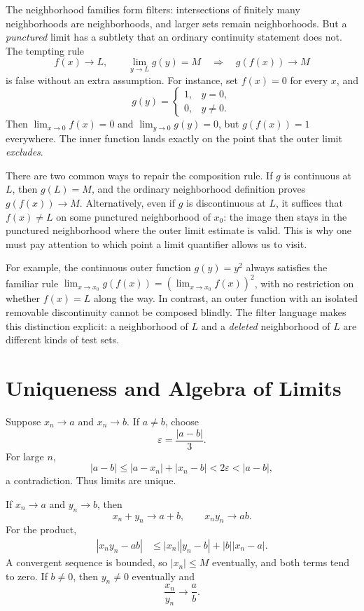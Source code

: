 The neighborhood families form filters: intersections of finitely many neighborhoods are neighborhoods, and larger sets remain neighborhoods. But a \emph{punctured} limit has a subtlety that an ordinary continuity statement does not. The tempting rule
\[
 f(x)\longrightarrow L,\qquad
 \lim_{y\to L}g(y)=M
 \quad\Longrightarrow\quad
 g(f(x))\longrightarrow M
\]
is false without an extra assumption. For instance, set \(f(x)=0\) for every \(x\), and
\[
 g(y)=
 \begin{cases}1,&y=0,\\0,&y\ne0.\end{cases}
\]
Then \(\lim_{x\to0}f(x)=0\) and \(\lim_{y\to0}g(y)=0\), but
\(g(f(x))=1\) everywhere. The inner function lands exactly on the point that the outer limit \emph{excludes}.

There are two common ways to repair the composition rule. If \(g\) is continuous at \(L\), then \(g(L)=M\), and the ordinary neighborhood definition proves \(g(f(x))\to M\). Alternatively, even if \(g\) is discontinuous at \(L\), it suffices that \(f(x)\ne L\) on some punctured neighborhood of \(x_0\): the image then stays in the punctured neighborhood where the outer limit estimate is valid. This is why one must pay attention to which point a limit quantifier allows us to visit.

For example, the continuous outer function \(g(y)=y^2\) always satisfies the familiar rule
\(\lim_{x\to x_0}g(f(x))=(\lim_{x\to x_0}f(x))^2\), with no restriction on whether \(f(x)=L\) along the way. In contrast, an outer function with an isolated removable discontinuity cannot be composed blindly. The filter language makes this distinction explicit: a neighborhood of \(L\) and a \emph{deleted} neighborhood of \(L\) are different kinds of test sets.

\section{Uniqueness and Algebra of Limits}

Suppose \(x_n\to a\) and \(x_n\to b\).  If \(a\ne b\), choose
\[
  \varepsilon=\frac{|a-b|}{3}.
\]
For large \(n\),
\[
  |a-b|
  \le|a-x_n|+|x_n-b|
  <2\varepsilon
  <|a-b|,
\]
a contradiction.  Thus limits are unique.

If \(x_n\to a\) and \(y_n\to b\), then
\[
  x_n+y_n\to a+b,
  \qquad
  x_ny_n\to ab.
\]
For the product,
\[
\begin{aligned}
  |x_ny_n-ab|
  &\le |x_n||y_n-b|+|b||x_n-a|.
\end{aligned}
\]
A convergent sequence is bounded, so \(|x_n|\le M\) eventually, and both terms tend to zero.  If \(b\ne0\), then \(y_n\ne0\) eventually and
\[
  \frac{x_n}{y_n}\to\frac ab.
\]

